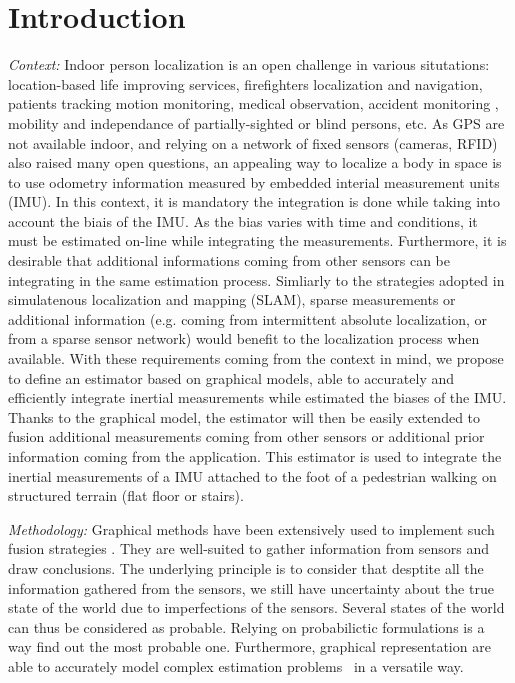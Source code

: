 
\section{Introduction}\label{sec:intro}

\textit{Context: }
Indoor person localization is an open challenge in various situtations: location-based life improving services, firefighters localization and navigation, patients tracking 
motion monitoring, medical observation, accident monitoring \cite{pourhomayoun2012spatial}, mobility and independance of partially-sighted or blind persons, etc.
As GPS are not available indoor, and relying on a network of fixed sensors (cameras, RFID) also raised many open questions, an appealing way to localize a body in space is to use odometry information measured by embedded interial measurement units (IMU).
In this context, it is mandatory the integration is done while taking into account the biais of the IMU.
As the bias varies with time and conditions, it must be estimated on-line while integrating the measurements.
Furthermore, it is desirable that additional informations coming from other sensors can be integrating in the same estimation process.
Simliarly to the strategies adopted in simulatenous localization and mapping (SLAM), sparse measurements or additional information (e.g. coming from intermittent absolute localization, or from a sparse sensor network) would benefit to the localization process when available.
With these requirements coming from the context in mind, we propose to define an estimator based on graphical models, able to accurately and efficiently integrate inertial measurements while estimated the biases of the IMU. Thanks to the graphical model, the estimator will then be easily extended to fusion additional measurements coming from other sensors or additional prior information coming from the application.
This estimator is used to integrate the inertial measurements of a IMU attached to the foot of a pedestrian walking on structured terrain (flat floor or stairs).


\textit{Methodology: }
Graphical methods have been extensively used to implement such fusion strategies \cite{Thrun:ijrr:2006,Kaess:itro:2008}.
They are well-suited to gather information from sensors
and draw conclusions. The underlying principle is to consider that desptite all the information gathered from the sensors, we still have uncertainty about the true state of the world due to imperfections of the sensors.
Several states of the world can thus be considered as probable.
Relying on probabilictic formulations is a way find out the most probable one. Furthermore, graphical representation are able to accurately model 
complex estimation problems~\cite{koller2009probabilistic} in a versatile way. 

